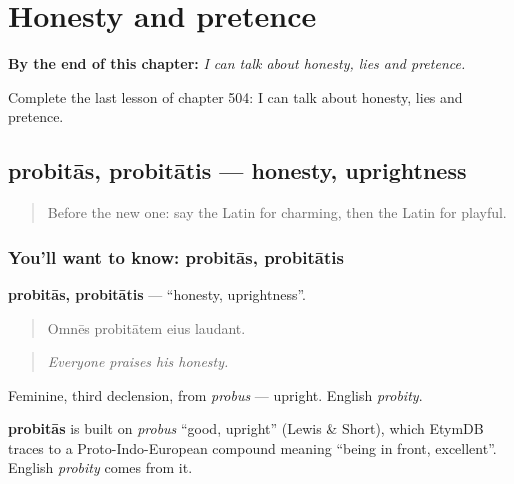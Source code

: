
\chapter{Honesty and pretence}
\label{ch:la-honesty-and-pretence}

\begin{chapteropening}
\textbf{By the end of this chapter:} \emph{I can talk about honesty, lies and pretence.}

Complete the last lesson of chapter 504: I can talk about honesty, lies and pretence.
\end{chapteropening}

\section[probitās, probitātis]{probitās, probitātis — honesty, uprightness}

\label{lesson:LA-C504-probitas}



\begin{quote}
Before the new one: say the Latin for charming, then the Latin for playful.
\end{quote}

\subsection*{You'll want to know: probitās, probitātis}
\textbf{probitās, probitātis} — \textquotedblleft{}honesty, uprightness\textquotedblright{}.

\begin{quote}
Omnēs probitātem eius laudant.
\end{quote}

\begin{quote}
\emph{Everyone praises his honesty.}
\end{quote}

Feminine, third declension, from \emph{probus} — upright. English \emph{probity}.

\begin{cousinweb}
\textbf{probitās} is built on \emph{probus} \textquotedblleft{}good, upright\textquotedblright{} (Lewis \& Short), which EtymDB traces to a Proto-Indo-European compound meaning \textquotedblleft{}being in front, excellent\textquotedblright{}. English \emph{probity} comes from it.
\end{cousinweb}

